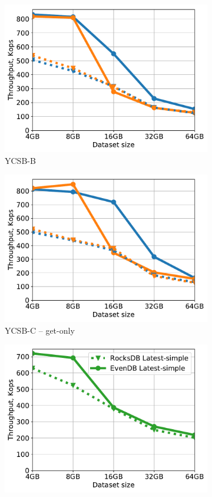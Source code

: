 \begin{figure}[tb]
\begin{subfigure}{0.33\linewidth}
\includegraphics[width=\textwidth]{figs/Workload_B_line.pdf}
\caption{YCSB-B}
\label{fig:throughput:b}
\end{subfigure}
\hspace{70pt}
\begin{subfigure}{0.33\linewidth}
\includegraphics[width=\textwidth]{figs/Workload_C_line.pdf}
\caption{YCSB-C -- get-only}
\label{fig:throughput:c}
\end{subfigure}
\begin{subfigure}{0.33\linewidth}
\includegraphics[width=\textwidth]{figs/Workload_D_line.pdf}

\end{subfigure}
\end{figure}
